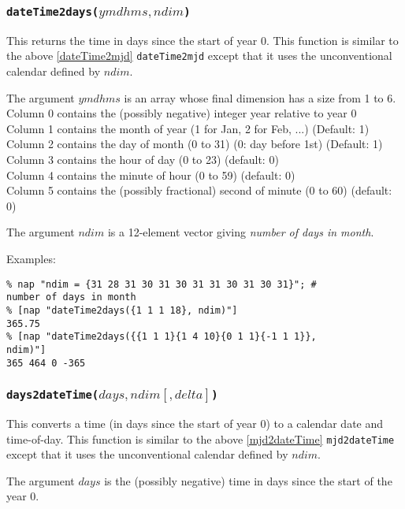       \subsubsection{
        \label{dateTime2days} \texttt{dateTime2days(}$ymdhms, ndim$\texttt{)}
      }
This returns the time in days since the start of year 0.
      This function is similar to the above 
      \ref{dateTime2mjd} \texttt{dateTime2mjd}  except that it uses the unconventional calendar defined by 
      $ndim$.
      

The argument 
      $ymdhms$ is an array whose final dimension has a size
      from 1 to 6.
      \\Column 0 contains the (possibly negative) integer year
      relative to year 0
      \\Column 1 contains the month of year (1 for Jan, 2 for Feb,
      ...) (Default: 1)
      \\Column 2 contains the day of month (0 to 31) (0: day before
      1st) (Default: 1)
      \\Column 3 contains the hour of day (0 to 23) (default: 0)
      \\Column 4 contains the minute of hour (0 to 59) (default: 0)
      \\Column 5 contains the (possibly fractional) second of
      minute (0 to 60) (default: 0)
      

The argument 
      $ndim$ is a 12-element vector giving 
      \emph{number of days in month}.
      

Examples:
      \begin{verbatim}
% nap "ndim = {31 28 31 30 31 30 31 31 30 31 30 31}"; #
number of days in month
% [nap "dateTime2days({1 1 1 18}, ndim)"]
365.75
% [nap "dateTime2days({{1 1 1}{1 4 10}{0 1 1}{-1 1 1}},
ndim)"]
365 464 0 -365
\end{verbatim}

      \subsubsection{
        \label{days2dateTime} \texttt{days2dateTime(}$days, ndim[, delta]$\texttt{)}
      }
This converts a time (in days since the start of year 0) to
      a calendar date and time-of-day. This function is similar to the
      above 
      \ref{mjd2dateTime} \texttt{mjd2dateTime}  except that it uses the unconventional calendar defined by 
      $ndim$.
      

The argument 
      $days$ is the (possibly negative) time in days since the
      start of the year 0.
      

